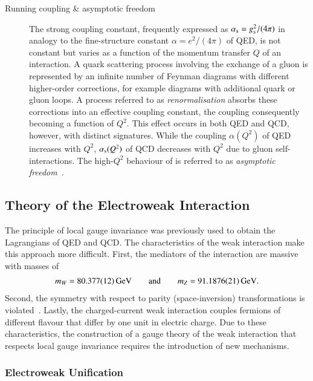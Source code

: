 \begin{description}
\item[Running coupling \& asymptotic freedom] The strong coupling constant,
  frequently expressed as $\alpha_{\text{s}} = g_{\text{s}}^2 / (4 \pi)$ in analogy to the
  fine-structure constant $\alpha = e^2 / (4 \pi)$ of QED, is not constant but
  varies as a function of the momentum transfer $Q$ of an interaction. A quark
  scattering process involving the exchange of a gluon is represented by an
  infinite number of Feynman diagrams with different higher-order corrections,
  for example diagrams with additional quark or gluon loops. A process referred
  to as \emph{renormalisation} absorbs these corrections into an effective
  coupling constant, the coupling consequently becoming a function of
  $Q^2$. This effect occurs in both QED and QCD, however, with distinct
  signatures. While the coupling $\alpha(Q^2)$ of QED increases with $Q^2$,
  $\alpha_{\text{s}}(Q^2)$ of QCD decreases with $Q^2$ due to gluon self-interactions. The
  high-$Q^2$ behaviour of \alphas is referred to as \emph{asymptotic
    freedom}~\cite{Gross:1973id,Politzer:1973fx}.
\end{description}


\subsection{Theory of the Electroweak Interaction}%
\label{seq:theory_ewk}

The principle of local gauge invariance was previously used to obtain the
Lagrangians of QED and QCD. The characteristics of the weak interaction make
this approach more difficult. First, the mediators of the interaction are
massive with masses of ~\cite{pdg2020}
\begin{align*}
  m_W = \SI{80.377 +- 0.012}{\ensuremath{\text{GeV}}}
  \qquad \text{and} \qquad
  m_{Z} = \SI{91.1876 +- 0.0021}{\ensuremath{\text{GeV}}} \text{.}
\end{align*}
Second, the symmetry with respect to parity (space-inversion) transformations is
violated~\cite{Wu:1957my}. Lastly, the charged-current weak interaction couples
fermions of different flavour that differ by one unit in electric charge. Due to
these characteristics, the construction of a gauge theory of the weak
interaction that respects local gauge invariance requires the introduction of
new mechanisms.

\subsubsection{Electroweak Unification}

